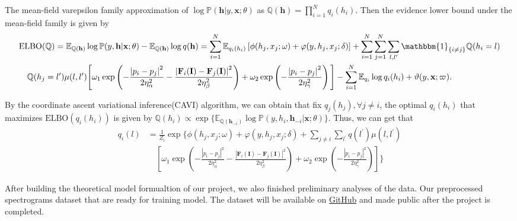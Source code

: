 \documentclass[10pt]{article}
\newcommand{\EE}{{\mathbb{E}}}
\newcommand{\PP}{{\mathbb{P}}}
\newcommand{\QQ}{{\mathbb{Q}}}
\newcommand{\Fb}{\mathbf{F}}
\newcommand{\Ib}{\mathbf{I}}
\newcommand{\hb}{\mathbf{h}}
\newcommand{\xb}{\mathbf{x}}
\newcommand{\one}{\mathbbm{1}}
\begin{document}
The mean-field varepsilon family approximation of
$\log\PP(\hb \vert y, \xb; \theta)$ as $\QQ(\hb) = \prod_{i=1}^N q_i(h_i)$.
Then the evidence lower bound under the mean-field family is given by
\vspace{-1cm}
\begin{equation*}
\begin{split}
& \textrm{ELBO}(\QQ) = \EE_{\QQ(\hb)} \log\PP(y, \hb \vert \xb; \theta)
- \EE_{\QQ(\hb)} \log q(\hb) = \sum_{i=1}^N \EE_{q_i(h_i)}
\left[ \phi(h_j, x_j; \omega) + \varphi(y, h_j, x_j; \delta) \right]
+ \sum_{i=1}^N \sum_{j=1}^N \sum_{l,l^\prime} \one_{\{i \neq j\}}\QQ(h_i = l) \\
&\quad \QQ(h_j = l^\prime) \mu(l, l^\prime)
\Bigg[ \omega_1 \exp \left(
- \frac{\left\lvert p_i - p_j \right\rvert^2}{2\eta_\alpha^2}
- \frac{\left\lvert \Fb_i(\Ib) - \Fb_j(\Ib) \right\rvert^2}{2\eta_\beta^2}
\right)
+ \omega_2 \exp \left(
- \frac{\left\lvert p_i - p_j \right\rvert^2}{2\eta_\gamma^2}
\right) \Bigg]
- \sum_{i=1}^N \EE_{q_i} \log q_i(h_i) + \vartheta(y, \xb; \varpi).
\end{split}
\end{equation*}


By the coordinate ascent variational inference(CAVI) algorithm,
we can obtain that fix $q_j(h_j), \forall j \neq i$, the optimal $q_i(h_i)$
that maximizes $\textrm{ELBO}(q_i(h_i))$ is given by
$\QQ(h_i) \propto \exp\{\EE_{\QQ(\hb_{-i})}
\log\PP(y, h_i, \hb_{-i} \vert \xb; \theta)\}$.
Thus, we can get that
\begin{equation*}
\begin{split}
q_i(l) &= \frac{1}{Z_i} \exp \Bigg\{
\phi(h_j, x_j; \omega) + \varphi(y, h_j, x_j; \delta)
+ \sum_{j \neq i} \sum_{l^\prime} q(l^\prime) \mu(l, l^\prime) \\
&\quad \left[ \omega_1 \exp \left(
- \frac{\left\lvert p_i - p_j \right\rvert^2}{2\eta_\alpha^2}
- \frac{\left\lvert \Fb_i(\Ib) - \Fb_j(\Ib) \right\rvert^2}{2\eta_\beta^2}
\right)
+ \omega_2 \exp \left(
- \frac{\left\lvert p_i - p_j 
\right\rvert^2}{2\eta_\gamma^2}
\right)
\right]
\Bigg\}
\end{split}
\end{equation*}


After building the theoretical model formualtion of our project, we also
finished preliminary analyses of the data. Our preprocessed spectrograms
dataset that are ready for training model. The dataset will be available on
\href{https://github.com/Carol-seven/Transformer-CRF_EEG}{GitHub} and
made public after the project is completed.
\end{document}

